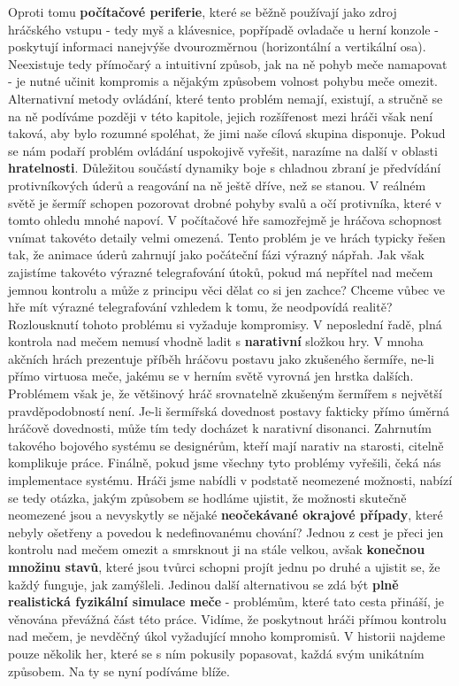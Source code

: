 Oproti tomu \textbf{počítačové periferie}, které se běžně používají jako zdroj hráčského vstupu - tedy myš a klávesnice, popřípadě ovladače u herní konzole - poskytují informaci nanejvýše dvourozměrnou (horizontální a vertikální osa). Neexistuje tedy přímočarý a intuitivní způsob, jak na ně pohyb meče namapovat - je nutné učinit kompromis a nějakým způsobem volnost pohybu meče omezit. Alternativní metody ovládání, které tento problém nemají, existují, a stručně se na ně podíváme později v této kapitole, jejich rozšířenost mezi hráči však není taková, aby bylo rozumné spoléhat, že jimi naše cílová skupina disponuje.
\bigbreak
Pokud se nám podaří problém ovládání uspokojivě vyřešit, narazíme na další v oblasti \textbf{hratelnosti}. Důležitou součástí dynamiky boje s chladnou zbraní je předvídání protivníkových úderů a reagování na ně ještě dříve, než se stanou. V reálném světě je šermíř schopen pozorovat drobné pohyby svalů a očí protivníka, které v tomto ohledu mnohé napoví. V počítačové hře samozřejmě je hráčova schopnost vnímat takovéto detaily velmi omezená. Tento problém je ve hrách typicky řešen tak, že animace úderů zahrnují jako počáteční fázi výrazný nápřah. Jak však zajistíme takovéto výrazné telegrafování útoků, pokud má nepřítel nad mečem jemnou kontrolu a může z principu věci dělat co si jen zachce? Chceme vůbec ve hře mít výrazné telegrafování vzhledem k tomu, že neodpovídá realitě? Rozlousknutí tohoto problému si vyžaduje kompromisy.
\bigbreak
V neposlední řadě, plná kontrola nad mečem nemusí vhodně ladit s \textbf{narativní} složkou hry. V mnoha akčních hrách prezentuje příběh hráčovu postavu jako zkušeného šermíře, ne-li přímo virtuosa meče, jakému se v herním světě vyrovná jen hrstka dalších. Problémem však je, že většinový hráč srovnatelně zkušeným šermířem s největší pravděpodobností není. Je-li šermířská dovednost postavy fakticky přímo úměrná hráčově dovednosti, může tím tedy docházet k narativní disonanci. Zahrnutím takového bojového systému se designérům, kteří mají narativ na starosti, citelně komplikuje práce. 
\bigbreak
Finálně, pokud jsme všechny tyto problémy vyřešili, čeká nás implementace systému. Hráči jsme nabídli v podstatě neomezené možnosti, nabízí se tedy otázka, jakým způsobem se hodláme ujistit, že možnosti skutečně neomezené jsou a nevyskytly se nějaké \textbf{neočekávané okrajové případy}, které nebyly ošetřeny a povedou k nedefinovanému chování? Jednou z cest je přeci jen kontrolu nad mečem omezit a smrsknout ji na stále velkou, avšak \textbf{konečnou množinu stavů}, které jsou tvůrci schopni projít jednu po druhé a ujistit se, že každý funguje, jak zamýšleli. Jedinou další alternativou se zdá být \textbf{plně realistická fyzikální simulace meče} - problémům, které tato cesta přináší, je věnována převážná část této práce.  
\bigbreak
Vidíme, že poskytnout hráči přímou kontrolu nad mečem, je nevděčný úkol vyžadující mnoho kompromisů. V historii najdeme pouze několik her, které se s ním pokusily popasovat, každá svým unikátním způsobem. Na ty se nyní podíváme blíže.

